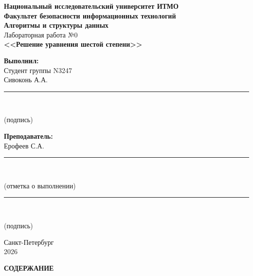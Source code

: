 \documentclass[a4paper,14pt]{extarticle}
\begin{document}
\begin{titlepage}
\begin{center}

\textbf{Национальный исследовательский университет ИТМО}\\[0.5cm]
\textbf{Факультет безопасности информационных технологий}\\[2cm]

{\Large\textbf{Алгоритмы и структуры данных}}\\[1cm]
{\large Лабораторная работа №0}\\[0.5cm]
{\large\textbf{<<Решение уравнения шестой степени>>}}\\[3cm]

\begin{flushright}
\begin{minipage}{0.45\textwidth}
\textbf{Выполнил:}\\
Студент группы N3247{\hspace{3cm}}\\
Сивоконь А.А. {\hspace{5cm}}\\[1cm]
\vspace{0cm}

\noindent\rule{6cm}{0.4pt}\\
\centerline{(подпись)}

\vspace{0.5cm}

\textbf{Преподаватель:}\\
Ерофеев С.А. {\hspace{5cm}}\\[1cm]
\noindent\rule{6cm}{0.4pt}\\
\centerline{(отметка о выполнении)}

\vspace{1.5cm}

\noindent\rule{6cm}{0.4pt}\\
\centerline{(подпись)}
\end{minipage}
\end{flushright}

\vfill

Санкт-Петербург\\
2026

\end{center}
\end{titlepage}

\newpage
\begin{center}
\textbf{СОДЕРЖАНИЕ}
\end{center}
\end{document}
